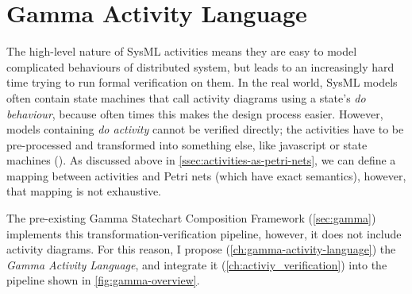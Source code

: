 \chapter{Gamma Activity Language}\label{ch:gamma-activity-language}

The high-level nature of SysML activities means they are easy to model complicated behaviours of distributed system, but leads to an increasingly hard time trying to run formal verification on them. In the real world, SysML models often contain state machines that call activity diagrams using a state's \emph{do behaviour}, because often times this makes the design process easier. However, models containing \emph{do activity} cannot be verified directly; the activities have to be pre-processed and transformed into something else, like javascript or state machines (). As discussed above in \autoref{ssec:activities-as-petri-nets}, we can define a mapping between activities and Petri nets (which have exact semantics), however, that mapping is not exhaustive.

The pre-existing Gamma Statechart Composition Framework (\autoref{sec:gamma}) implements this transformation-verification pipeline, however, it does not include activity diagrams. For this reason, I propose (\autoref{ch:gamma-activity-language}) the \emph{Gamma Activity Language}, and integrate it (\autoref{ch:activiy_verification}) into the pipeline shown in \autoref{fig:gamma-overview}.




